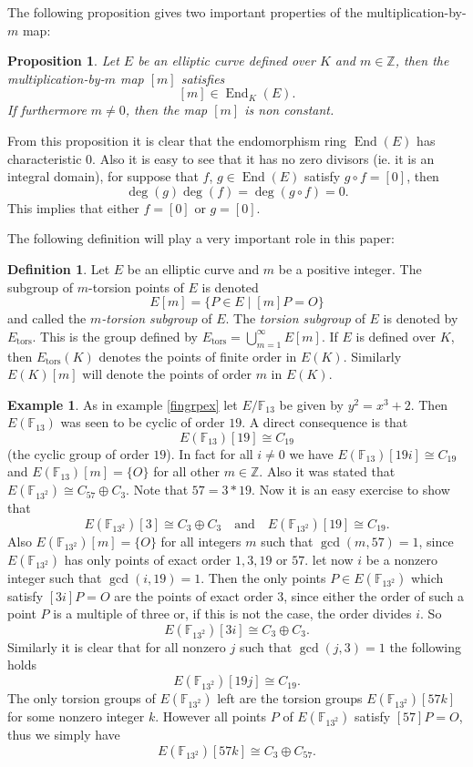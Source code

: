 \documentclass{article}
\numberwithin{equation}{section}
\newtheorem{proposition}[theorem]{Proposition}
\theoremstyle{definition}
\newtheorem{definition}[theorem]{Definition}
\newtheorem{example}[theorem]{Example}
\newcommand{\ZZ}{{\mathbb Z}} %
\newcommand{\FF}[1]{{\mathbb F}_{#1}} %
\newcommand{\degree}[1]{\operatorname{deg} \left(#1\right)} %
\newcommand{\Endring}[1]{\operatorname{End} (#1)} %
\newcommand{\Endringk}[2]{\operatorname{End}_{#2} (#1)} %
\begin{document}
The following proposition gives two important properties of the multiplication-by-$m$ map:

\begin{proposition}\label{multbymmapproperties} Let $E$ be an elliptic curve defined over $K$ and $m \in \ZZ$, then the multiplication-by-$m$ map $[m]$ satisfies $$[m] \in \Endringk{E}{K}.$$ If furthermore $m \neq 0$, then the map $[m]$ is non constant.
\end{proposition}

From this proposition it is clear that the endomorphism ring $\Endring{E}$ has characteristic $0$. Also it is easy to see that it has no zero divisors (ie. it is an integral domain), for suppose that $f$, $g \in \Endring{E}$ satisfy $g \circ f =[0]$, then $$\degree{g}\degree{f}=\degree{g \circ f} = 0.$$ This implies that either $f = [0]$ or $g = [0]$.\par 
The following definition will play a very important role in this paper:

\begin{definition}\label{mtorsionpoints}
Let $E$ be an elliptic curve and $m$ be a positive integer. The subgroup of $m$-torsion points of $E$ is denoted $$E[m]=\{P \in E \; | \; [m]P=O\}$$ and called the \emph{$m$-torsion subgroup} of $E$. The \emph{torsion subgroup} of $E$ is denoted by $E_\text{tors}$. This is the group defined by $E_\text{tors} = \bigcup_{m=1}^\infty E[m]$. If $E$ is defined over $K$, then $E_\text{tors}(K)$ denotes the points of finite order in $E(K)$. Similarly $E(K)[m]$ will denote the points of order $m$ in $E(K)$.
\end{definition}

\begin{example}
As in example \ref{fingrpex} let $E/\FF{13}$ be given by $y^2=x^3+2$. Then $E(\FF{13})$ was seen to be cyclic of order $19$. A direct consequence is that $$E(\FF{13})[19] \cong C_{19}$$ (the cyclic group of order $19$). In fact for all $i \neq 0$ we have $E(\FF{13})[19i] \cong C_{19}$ and $E(\FF{13})[m] = \{O\}$ for all other $m \in \ZZ$. Also it was stated that $E(\FF{13^2}) \cong   C_{57} \oplus C_3$. Note that $57=3*19$. Now it is an easy exercise to show that $$E(\FF{13^2})[3] \cong C_3 \oplus C_3 \quad \text{and} \quad E(\FF{13^2})[19] \cong C_{19}. $$ Also $E(\FF{13^2})[m] =\{O\}$ for all integers $m$ such that $\gcd(m,57)=1$, since $E(\FF{13^2})$ has only points of exact order $1,3,19$ or $57$. let now $i$ be a nonzero integer such that $\gcd(i,19)=1$. Then the only points $P\in E(\FF{13^2})$ which satisfy $[3i]P=O$ are the points of exact order $3$, since either the order of such a point $P$ is a multiple of three or, if this is not the case, the order divides $i$. So $$E(\FF{13^2})[3i]\cong C_3 \oplus C_3.$$  Similarly it is clear that for all nonzero $j$ such that $\gcd(j,3)=1$ the following holds $$ E(\FF{13^2})[19j]\cong C_{19}. $$ The only torsion groups of $E(\FF{13^2})$ left are the torsion groups $E(\FF{13^2})[57k]$ for some nonzero integer $k$. However all points $P$ of $E(\FF{13^2})$ satisfy $[57]P=O$, thus we simply have $$E(\FF{13^2})[57k] \cong C_3 \oplus C_{57}.$$
\end{example}
\end{document}
